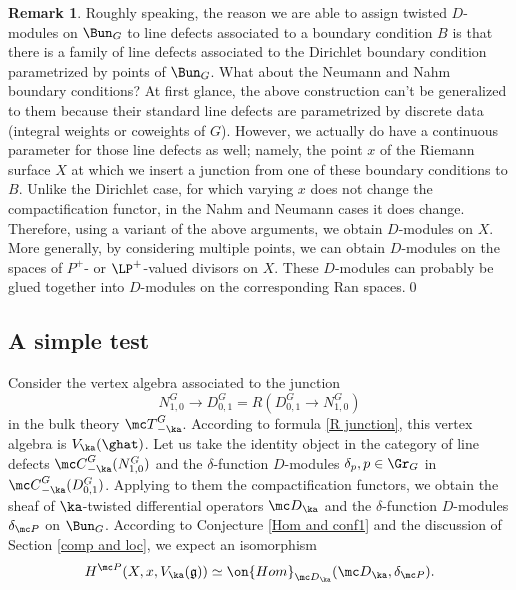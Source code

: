 \documentclass[11pt,reqno]{amsart}
\theoremstyle{plain}
\numberwithin{equation}{section}
\newcommand{\g}{\mathfrak{g}}
\theoremstyle{definition}
\newtheorem{rem}{Remark}[section]
\begin{document}
\begin{rem}
Roughly speaking, the reason we are able to assign twisted $D$-modules
on $\Bun_G$ to line defects associated to a boundary condition $B$ is
that there is a family of line defects associated to the Dirichlet
boundary condition parametrized by points of $\Bun_G$. What about
the Neumann and Nahm boundary conditions? At first glance, the above
construction can't be generalized to them because their standard line
defects are parametrized by discrete data (integral weights or
coweights of $G$). However, we actually do have a continuous parameter
for those line defects as well; namely, the point $x$ of the Riemann
surface $X$ at which we insert a junction from one of these boundary
conditions to $B$. Unlike the Dirichlet case,
for which varying $x$ does not change the compactification functor, in
the Nahm and Neumann cases it does change. Therefore, using a variant
of the above arguments, we obtain $D$-modules on $X$. More generally, by
considering multiple points, we can obtain $D$-modules on the spaces
of $P^+$- or $\LP^+$-valued divisors on $X$. These $D$-modules can
probably be glued together into $D$-modules on the corresponding Ran
spaces.\qed
\end{rem}

\subsection{A simple test}    \label{test}

Consider the vertex algebra associated to the junction
$$
N^G_{1,0} \to D^G_{0,1} = R(D^G_{0,1} \to N^G_{1,0})
$$
in the bulk theory ${\mc T}^G_{-\ka}$. According to formula \eqref{R
  junction}, this vertex algebra is $V_\ka(\ghat)$. Let us take the
identity object in the category of line defects ${\mc
  C}^G_{-\ka}(N^G_{1,0})$ and the $\delta$-function $D$-modules
$\delta_p, p \in \Gr_G$ in ${\mc C}^G_{-\ka}(D^G_{0,1})$. Applying to
them the compactification functors, we obtain the sheaf of
$\ka$-twisted differential operators ${\mc D}_\ka$ and the
$\delta$-function $D$-modules $\delta_{\mc P}$ on $\Bun_G$. According
to Conjecture \ref{Hom and conf1} and the discussion of Section
\ref{comp and loc}, we expect an isomorphism
\begin{equation}    \label{H as Hom}
H^{\mc P}(X,x,V_\ka(\g)) \simeq \on{Hom}_{{\mc D}_\ka}({\mc
  D}_\ka,\delta_{\mc P}).
\end{equation}
\end{document}
